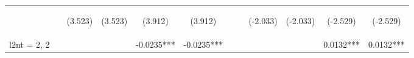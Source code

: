 \documentclass[]{article}
\begin{document}
\begin{center}
\begin{tabular}{lccccccccccc}
        \vspace{4pt}     & \begin{footnotesize}\end{footnotesize}         & \begin{footnotesize}(3.523)\end{footnotesize}  & \begin{footnotesize}(3.523)\end{footnotesize}  & \begin{footnotesize}(3.912)\end{footnotesize}  & \begin{footnotesize}(3.912)\end{footnotesize}  & \begin{footnotesize}\end{footnotesize}          & \begin{footnotesize}\end{footnotesize}          & \begin{footnotesize}(-2.033)\end{footnotesize} & \begin{footnotesize}(-2.033)\end{footnotesize} & \begin{footnotesize}(-2.529)\end{footnotesize} & \begin{footnotesize}(-2.529)\end{footnotesize} \\
        l2nt = 2, 2      &                                                &                                                &                                                & -0.0235***                                     & -0.0235***                                     &                                                 &                                                 &                                                &                                                & 0.0132***                                      & 0.0132***                                      \\

\end{tabular}
\end{center}
\end{document}
